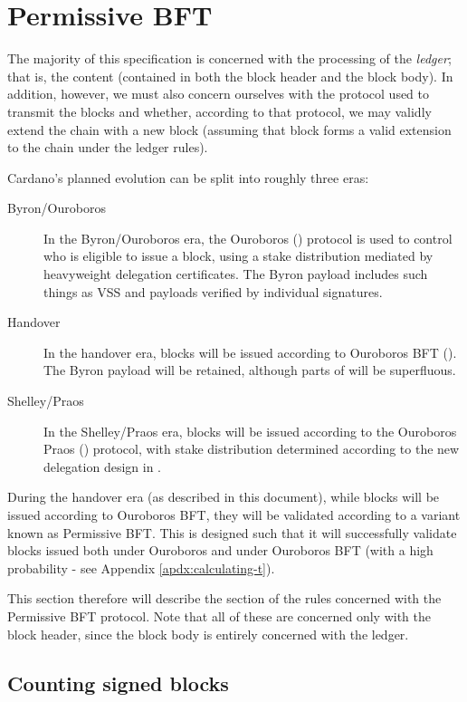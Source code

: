 \documentclass[11pt,a4paper]{article}
\begin{document}
\clearpage
\section{Permissive BFT}

The majority of this specification is concerned with the processing of the
\textit{ledger}; that is, the content (contained in both the block header and
the block body). In addition, however, we must also concern ourselves with the
protocol used to transmit the blocks and whether, according to that protocol, we
may validly extend the chain with a new block (assuming that block forms a valid
extension to the chain under the ledger rules).

Cardano's planned evolution can be split into roughly three eras:
\begin{description}
\item[Byron/Ouroboros] In the Byron/Ouroboros era, the Ouroboros (\cite{ouroboros})
  protocol is used to control who is eligible to issue a block, using a stake
  distribution mediated by heavyweight delegation certificates. The Byron
  payload includes such things as VSS and payloads verified by individual
  signatures.
\item[Handover] In the handover era, blocks will be issued according to
  Ouroboros BFT (\cite{ouroboros_bft}). The Byron payload will be retained, although
  parts of will be superfluous.
\item[Shelley/Praos] In the Shelley/Praos era, blocks will be issued according
  to the Ouroboros Praos (\cite{ouroboros_praos}) protocol, with stake distribution
  determined according to the new delegation design in \cite{delegation_design}.
\end{description}

During the handover era (as described in this document), while blocks will be
issued according to Ouroboros BFT, they will be validated according to a variant
known as Permissive BFT. This is designed such that it will successfully
validate blocks issued both under Ouroboros and under Ouroboros BFT (with a high
probability - see Appendix \ref{apdx:calculating-t}).

This section therefore will describe the section of the rules concerned with the
Permissive BFT protocol. Note that all of these are concerned only with the
block header, since the block body is entirely concerned with the ledger.

\subsection{Counting signed blocks}
\end{document}
